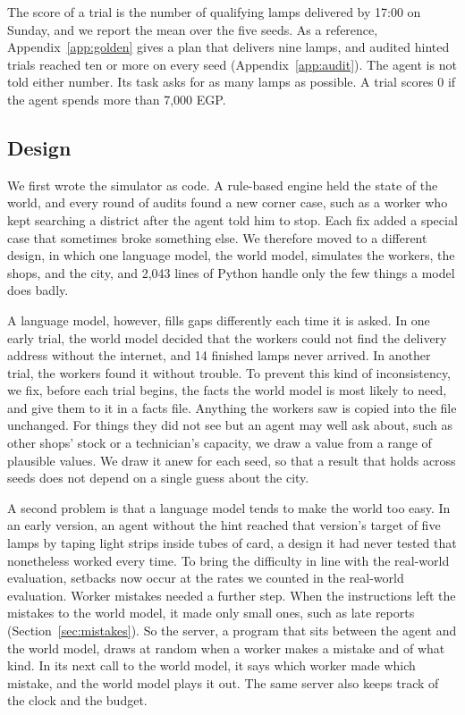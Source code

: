 \documentclass[10pt]{article}
\begin{document}
The score of a trial is the number of qualifying lamps delivered by 17:00 on Sunday, and we report the mean over the five seeds. As a reference, Appendix~\ref{app:golden} gives a plan that delivers nine lamps, and audited hinted trials reached ten or more on every seed (Appendix~\ref{app:audit}). The agent is not told either number. Its task asks for as many lamps as possible. A trial scores 0 if the agent spends more than 7,000 EGP.

\subsection{Design}
\label{sec:design}

We first wrote the simulator as code. A rule-based engine held the state of the world, and every round of audits found a new corner case, such as a worker who kept searching a district after the agent told him to stop. Each fix added a special case that sometimes broke something else. We therefore moved to a different design, in which one language model, the world model, simulates the workers, the shops, and the city, and 2,043 lines of Python handle only the few things a model does badly.

A language model, however, fills gaps differently each time it is asked. In one early trial, the world model decided that the workers could not find the delivery address without the internet, and 14 finished lamps never arrived. In another trial, the workers found it without trouble. To prevent this kind of inconsistency, we fix, before each trial begins, the facts the world model is most likely to need, and give them to it in a facts file. Anything the workers saw is copied into the file unchanged. For things they did not see but an agent may well ask about, such as other shops' stock or a technician's capacity, we draw a value from a range of plausible values. We draw it anew for each seed, so that a result that holds across seeds does not depend on a single guess about the city.

A second problem is that a language model tends to make the world too easy. In an early version, an agent without the hint reached that version's target of five lamps by taping light strips inside tubes of card, a design it had never tested that nonetheless worked every time. To bring the difficulty in line with the real-world evaluation, setbacks now occur at the rates we counted in the real-world evaluation. Worker mistakes needed a further step. When the instructions left the mistakes to the world model, it made only small ones, such as late reports (Section~\ref{sec:mistakes}). So the server, a program that sits between the agent and the world model, draws at random when a worker makes a mistake and of what kind. In its next call to the world model, it says which worker made which mistake, and the world model plays it out. The same server also keeps track of the clock and the budget.
\end{document}
